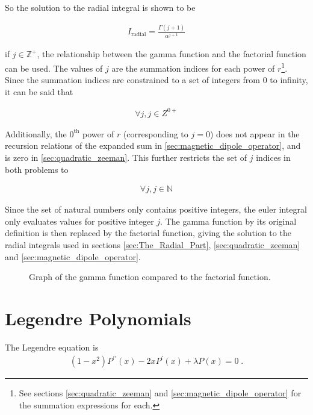         \noindent So the solution to the radial integral is shown to be 

        \begin{align}
            I_{\text{radial}} = \frac{\Gamma(j+1)}{\alpha^{j+1}}
        \end{align}

        \noindent if $j \in \mathbb{Z}^+$, the relationship between the gamma function and the factorial function can be used. The values of $j$ are the summation indices for each power of $r$\footnote{See sections \ref{sec:quadratic_zeeman} and \ref{sec:magnetic_dipole_operator} for the summation expressions for each.}. Since the summation indices are constrained to a set of integers from 0 to infinity, it can be said that 

        \begin{align}
            \forall j, j \in Z^{0+}
        \end{align}

        \noindent Additionally, the $0^{\text{th}}$ power of $r$ (corresponding to $j = 0$) does not appear in the recursion relations of the expanded sum in \ref{sec:magnetic_dipole_operator}, and is zero in \ref{sec:quadratic_zeeman}. This further restricts the set of $j$ indices in both problems to 

        \begin{align}
            \forall j, j\in \mathbb{N}
        \end{align}

        \noindent Since the set of natural numbers only contains positive integers, the euler integral only evaluates values for positive integer $j$. The gamma function by its original definition is then replaced by the factorial function, giving the solution to the radial integrals used in sections \ref{sec:The_Radial_Part}, \ref{sec:quadratic_zeeman} and \ref{sec:magnetic_dipole_operator}. 

        \begin{figure}[ht!]
            \centering
            \resizebox{0.8\linewidth}{!}{}
            \caption{Graph of the gamma function compared to the factorial function.}
            \label{img:Gamma_fn_graph}
        \end{figure}

    \section{Legendre Polynomials} \label{sec:Legendre_Polynomial}
        The Legendre equation is 
        \begin{align}
            (1 - x^2)P^{\prime \prime}(x) -2xP^\prime(x) + \lambda P(x) = 0\;.
        \end{align}

